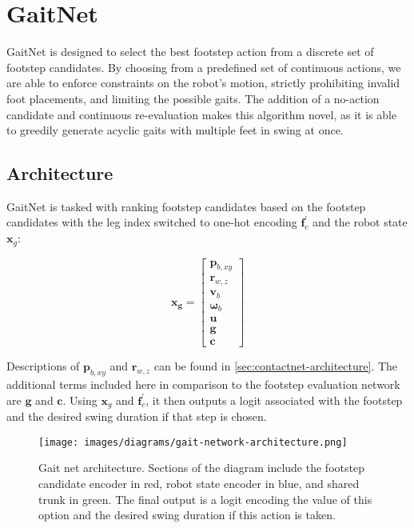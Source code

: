 \section{GaitNet}

GaitNet is designed to select the best footstep action from a discrete
set of footstep candidates. By choosing from a predefined set of
continuous actions,
we are able to enforce constraints on the robot's motion, strictly
prohibiting invalid foot placements, and limiting the possible gaits. The
addition of a no-action candidate and continuous re-evaluation makes this
algorithm novel, as it is able to greedily generate acyclic gaits with multiple
feet in swing at once.

\subsection{Architecture}

GaitNet is tasked with ranking footstep candidates based on the
footstep candidates with the leg index switched to one-hot encoding
$\mathbf f_c^{\prime}$ and the robot state $\mathbf x_g$:

\[
  \mathbf{x_g} =
  \begin{bmatrix}
    \mathbf p_{b,xy} \\
    \mathbf r_{w,z} \\
    \mathbf v_b \\
    \mathbf \omega_b \\
    \mathbf u \\
    \mathbf g \\
    \mathbf c
  \end{bmatrix}
\]

Descriptions of $\mathbf p_{b,xy}$ and $\mathbf r_{w,z}$ can be found in
\autoref{sec:contactnet-architecture}. The additional terms included
here in comparison to the footstep evaluation network are
$\mathbf g$ and $\mathbf c$. Using $\mathbf x_g$ and $\mathbf f_c^{\prime}$,
it then outputs a logit associated with the footstep and the desired swing
duration if that step is chosen.

\begin{figure}[H]
  \centering
  \texttt{[image: images/diagrams/gait-network-architecture.png]}
  \caption{Gait net architecture. Sections of the diagram include the
    footstep candidate encoder in red,
    robot state encoder in blue, and shared trunk in green.
    The final output is a logit encoding the value of this option and the
  desired swing duration if this action is taken.}
  \label{fig:diagram-gaitnet-architecture}
\end{figure}

